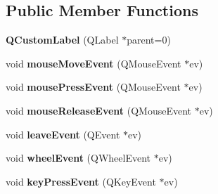 \subsection*{Public Member Functions}
\begin{DoxyCompactItemize}
\item 
\hypertarget{classQCustomLabel_a15eca432ecab522f162c87374ac6bca6}{{\bfseries Q\-Custom\-Label} (Q\-Label $\ast$parent=0)}\label{classQCustomLabel_a15eca432ecab522f162c87374ac6bca6}

\item 
\hypertarget{classQCustomLabel_a834a064e119add6ffb0ff1ea5ce78d7e}{void {\bfseries mouse\-Move\-Event} (Q\-Mouse\-Event $\ast$ev)}\label{classQCustomLabel_a834a064e119add6ffb0ff1ea5ce78d7e}

\item 
\hypertarget{classQCustomLabel_a971a01e5c52150d2874555c5d6b11807}{void {\bfseries mouse\-Press\-Event} (Q\-Mouse\-Event $\ast$ev)}\label{classQCustomLabel_a971a01e5c52150d2874555c5d6b11807}

\item 
\hypertarget{classQCustomLabel_ab88c55fd49219104cfabe91ed68aa496}{void {\bfseries mouse\-Release\-Event} (Q\-Mouse\-Event $\ast$ev)}\label{classQCustomLabel_ab88c55fd49219104cfabe91ed68aa496}

\item 
\hypertarget{classQCustomLabel_a99b5c445f092757d5f1e59c6aee6fb88}{void {\bfseries leave\-Event} (Q\-Event $\ast$ev)}\label{classQCustomLabel_a99b5c445f092757d5f1e59c6aee6fb88}

\item 
\hypertarget{classQCustomLabel_ae7a4aaaf4f56d95199d1279923d7ff92}{void {\bfseries wheel\-Event} (Q\-Wheel\-Event $\ast$ev)}\label{classQCustomLabel_ae7a4aaaf4f56d95199d1279923d7ff92}

\item 
\hypertarget{classQCustomLabel_a38e4ecf9b9298636b36594cdbace5260}{void {\bfseries key\-Press\-Event} (Q\-Key\-Event $\ast$ev)}\label{classQCustomLabel_a38e4ecf9b9298636b36594cdbace5260}

\end{DoxyCompactItemize}
